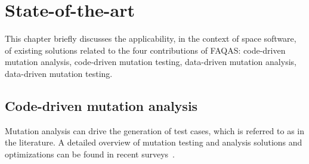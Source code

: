 \chapter{State-of-the-art}
\label{ch:stateOfTheArt}


This chapter briefly discusses the applicability, in the context of space software, of existing solutions related to the four contributions of FAQAS: code-driven mutation analysis, 
code-driven mutation testing, data-driven mutation analysis, 
data-driven mutation testing.

\section{Code-driven mutation analysis}
\label{sec:background}

Mutation analysis can drive the generation of test cases, which is referred to as  in the literature.
A detailed overview of mutation testing and analysis solutions and optimizations can be found in recent surveys~\cite{jia2010analysis,papadakis2019mutation}.

